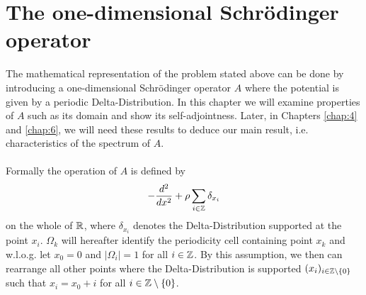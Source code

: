 \chapter{The one-dimensional Schrödinger operator} \label{chap:3}

The mathematical representation of the problem stated above can be done by introducing a one-dimensional Schrödinger operator $A$ where the potential is given by a periodic Delta-Distribution. In this chapter we will examine properties of $A$ such as its domain and show its self-adjointness. Later, in Chapters \ref{chap:4} and \ref{chap:6}, we will need these results to deduce our main result, i.e. characteristics of the spectrum of $A$. ~\\ ~\\
Formally the operation of $A$ is defined by %
\begin{equation}
	- \frac{d^{2}}{dx^{2}} + \rho \sum_{i \in \mathbb{Z}} \delta_{x_{i}} \label{the-operator-A-formally}
\end{equation}
on the whole of $\mathbb{R}$, where $\delta_{x_{i}}$ denotes the Delta-Distribution supported at the point $x_{i}$. $\Omega_{k}$ will hereafter identify the periodicity cell containing point $x_{k}$ and w.l.o.g. let $x_{0} = 0$ and $|\Omega_{i}| = 1$ for all $i \in \mathbb{Z}$. By this assumption, we then can rearrange all other points where the Delta-Distribution is supported $(x_{i})_{i \in \mathbb{Z} \setminus \{0\}}$ such that $x_{i} = x_{0} + i$ for all $i \in \mathbb{Z} \setminus \{0\}$. 
~\\  

